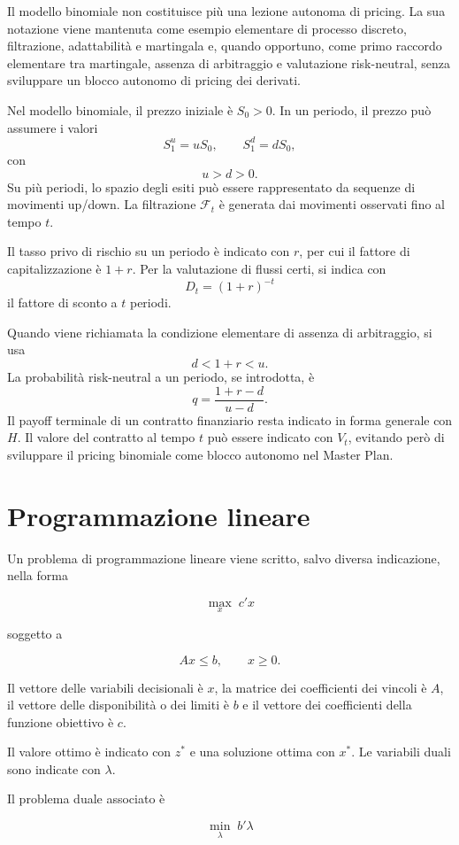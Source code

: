 \documentclass[12pt,a4paper]{article}
\newcommand{\F}{\mathcal{F}}
\newcommand{\1}{\mathbf{1}}
\begin{document}
Il modello binomiale non costituisce pi\`u una lezione autonoma di pricing.
La sua notazione viene mantenuta come esempio elementare di processo discreto,
filtrazione, adattabilit\`a e martingala e, quando opportuno, come primo
raccordo elementare tra martingale, assenza di arbitraggio e valutazione
risk-neutral, senza sviluppare un blocco autonomo di pricing dei derivati.

Nel modello binomiale, il prezzo iniziale \`e $S_0>0$. In un periodo, il
prezzo pu\`o assumere i valori
\[
S_1^u=uS_0,
\qquad
S_1^d=dS_0,
\]
con
\[
u>d>0.
\]
Su pi\`u periodi, lo spazio degli esiti pu\`o essere rappresentato da
sequenze di movimenti up/down. La filtrazione $\F_t$ \`e generata dai
movimenti osservati fino al tempo $t$.

Il tasso privo di rischio su un periodo \`e indicato con $r$, per cui il
fattore di capitalizzazione \`e $1+r$. Per la valutazione di flussi certi, si
indica con
\[
D_t=(1+r)^{-t}
\]
il fattore di sconto a $t$ periodi.

Quando viene richiamata la condizione elementare di assenza di arbitraggio, si
usa
\[
d<1+r<u.
\]
La probabilit\`a risk-neutral a un periodo, se introdotta, \`e
\[
q=\frac{1+r-d}{u-d}.
\]
Il payoff terminale di un contratto finanziario resta indicato in forma generale
con $H$. Il valore del contratto al tempo $t$ pu\`o essere indicato con
$V_t$, evitando per\`o di sviluppare il pricing binomiale come blocco autonomo
nel Master Plan.

\section{Programmazione lineare}

Un problema di programmazione lineare viene scritto, salvo diversa
indicazione, nella forma

\[
\max_{x}\;c'x
\]

soggetto a

\[
Ax\leq b,
\qquad
x\geq0.
\]

Il vettore delle variabili decisionali \`e $x$, la matrice dei coefficienti
dei vincoli \`e $A$, il vettore delle disponibilit\`a o dei limiti
\`e $b$ e il vettore dei coefficienti della funzione obiettivo \`e $c$.

Il valore ottimo \`e indicato con $z^{*}$ e una soluzione ottima con
$x^{*}$. Le variabili duali sono indicate con $\lambda$.

Il problema duale associato \`e

\[
\min_{\lambda}\;b'\lambda
\]
\end{document}
